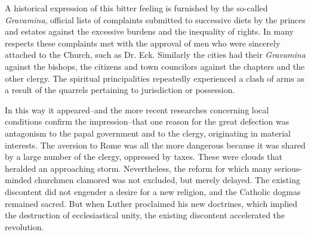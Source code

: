 A historical expression of this bitter feeling is furnished by the
so-called \textit{Gravamina}, official lists of complaints submitted to successive
diets by the princes and estates against the excessive burdens
and the inequality of rights. In many respects these complaints met
with the approval of men who were sincerely attached to the Church,
such as Dr. Eck. Similarly the cities had their \textit{Gravamina} against
the bishops, the citizens and town councilors against the chapters
and the other clergy. The spiritual principalities repeatedly experienced
a clash of arms as a result of the quarrels pertaining to jurisdiction or possession.

In this way it appeared--and the more recent researches concerning local
conditions confirm the impression--that one reason for
the great defection was antagonism to the papal government and
to the clergy, originating in material interests. The aversion to Rome
was all the more dangerous because it was shared by a large number
of the clergy, oppressed by taxes. These were clouds that heralded
an approaching storm. Nevertheless, the reform for which many
serious-minded churchmen clamored was not excluded, but merely
delayed. The existing discontent did not engender a desire for a
new religion, and the Catholic dogmas remained sacred. But when
Luther proclaimed his new doctrines, which implied the destruction
of ecclesiastical unity, the existing discontent accelerated the
revolution.
